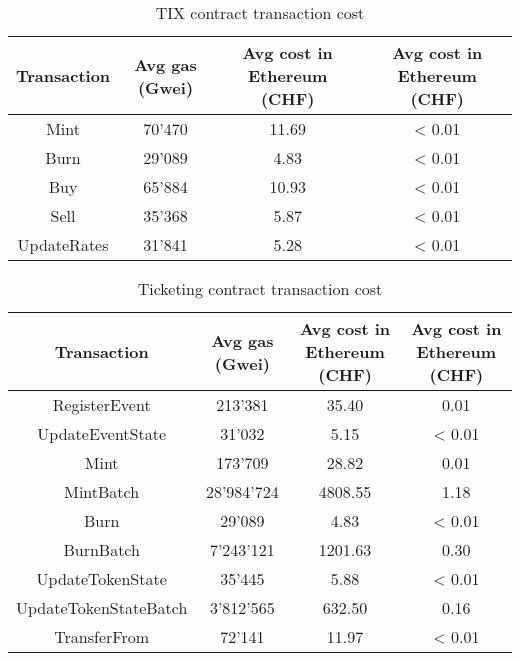 \documentclass[a4paper,11pt,oneside]{report}
\begin{document}
\begin{table}[h!]
\begin{center}
\begin{NiceTabular}{ |c||c|c|c| }
 \hline
 Transaction & Avg gas (Gwei) & Avg cost in Ethereum (CHF) & Avg cost in Ethereum (CHF) \\
 \hline \hline
 Mint & 70'470 & 11.69 & < 0.01 \\
 Burn & 29'089 & 4.83 & < 0.01 \\
 Buy & 65'884 & 10.93 & < 0.01 \\
 Sell & 35'368 & 5.87 & < 0.01 \\
 UpdateRates & 31'841 & 5.28 & < 0.01 \\
 \hline
\end{NiceTabular}
\caption{TIX contract transaction cost}
\label{table:tix_contract_transaction_cost}
\end{center}
\end{table}

\begin{table}[h!]
\begin{center}
\begin{NiceTabular}{ |c||c|c|c| }
 \hline
 Transaction & Avg gas (Gwei) & Avg cost in Ethereum (CHF) & Avg cost in Ethereum (CHF) \\
 \hline \hline
 RegisterEvent & 213'381 & 35.40 & 0.01 \\
 UpdateEventState & 31'032 & 5.15 & < 0.01 \\
 Mint & 173'709 & 28.82 & 0.01 \\
 MintBatch & 28'984'724 & 4808.55 & 1.18 \\
 Burn & 29'089 & 4.83 & < 0.01 \\
 BurnBatch & 7'243'121 & 1201.63 & 0.30 \\
 UpdateTokenState & 35'445 & 5.88 & < 0.01 \\
 UpdateTokenStateBatch & 3'812'565 & 632.50 & 0.16 \\
 TransferFrom & 72'141 & 11.97 & < 0.01 \\
 \hline
\end{NiceTabular}
\caption{Ticketing contract transaction cost}
\label{table:ticketing_contract_transcation_cost}
\end{center}
\end{table}
\end{document}
